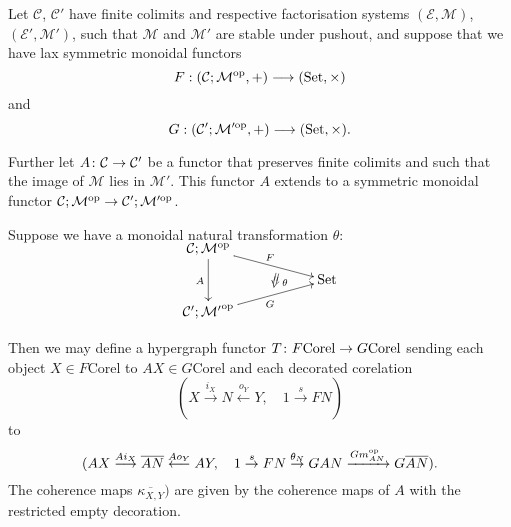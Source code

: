 \begin{proposition}\label{prop.deccorelfunctors}
  Let $\mathcal C$, $\mathcal C'$ have finite colimits and respective
factorisation systems $(\mathcal E, \mathcal M)$, $(\mathcal E', \mathcal M')$,
such that $\mathcal M$ and $\mathcal M'$ are stable under pushout, and suppose
that we have lax symmetric monoidal functors
\[
  F: (\mathcal C;\mathcal M^{\mathrm{op}},+) \longrightarrow (\mathrm{Set}, \times)
\]
and
\[
  G: (\mathcal C';\mathcal M'^{\mathrm{op}},+) \longrightarrow (\mathrm{Set}, \times).
\]

Further let $A{\colon} \mathcal C \to \mathcal C'$ be a functor that preserves
finite colimits and such that the image of $\mathcal M$ lies in $\mathcal M'$.
This functor $A$ extends to a symmetric monoidal functor $\mathcal C;\mathcal M^{\mathrm{op}} \to
\mathcal C';\mathcal M'^{\mathrm{op}}$.

Suppose we have a monoidal natural transformation $\theta$:
\[
  \xymatrixrowsep{2ex}
  \xymatrix{
    \mc C; \mc M^\opp \ar[dd]_{A} \ar[drr]^F  \\
    &\twocell \omit{_\:\theta}& \Set \\
    \mc C'; \mc {M'}^\opp \ar[urr]_{G} 
  }
\]

Then we may define a hypergraph functor $T{\colon} F\mathrm{Corel} \to
G\mathrm{Corel}$ sending each object $X \in F\mathrm{Corel}$ to $AX \in
G\mathrm{Corel}$ and each decorated corelation 
\[
  (X \stackrel{i_X}{\longrightarrow} N \stackrel{o_Y}{\longleftarrow} Y, \quad
  1 \stackrel{s}{\to} FN)
\]
to
\[
  (AX \stackrel{Ai_X}{\longrightarrow} \overline{AN} \stackrel{Ao_Y}{\longleftarrow} AY,
  \quad 1 \stackrel{s}{\to} FN \stackrel{\theta_N}{\to} GAN
  \xrightarrow{Gm_{AN}^{\mathrm{op}}} G\overline{AN}).
\]
The coherence maps $\overline{\kappa_{X,Y}})$ are given by the coherence maps of $A$ with the restricted empty decoration.
\end{proposition}

